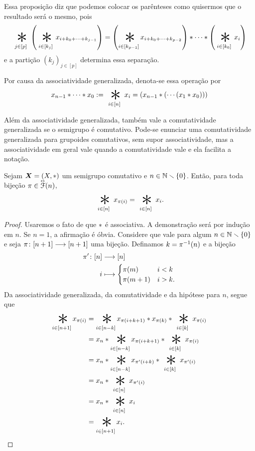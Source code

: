 Essa proposição diz que podemos colocar os parênteses como quisermos que o resultado será o mesmo, pois
	\begin{equation*}
	\bigopb_{j \in [p]}\left(\bigopb_{i \in [k_j]} x_{i + k_0 + \cdots + k_{j-1}}\right) = \left(\bigopb_{i \in [k_{p-1}]} x_{i + k_0 + \cdots + k_{p-2}}\right) \opb \cdots \opb \left(\bigopb_{i \in [k_0]} x_i\right)
	\end{equation*}
e a partição $(k_j)_{j \in [p]}$ determina essa separação.

\begin{notation}
Por causa da associatividade generalizada, denota-se essa operação por
	\begin{equation*}
	x_{n-1} \opb \cdots \opb x_0 := \bigopb_{i \in [n]} x_i = (x_{n-1} \opb ( \cdots (x_1 \opb x_0)))
	\end{equation*}
\end{notation}

Além da associatividade generalizada, também vale a comutatividade generalizada se o semigrupo é comutativo. Pode-se enunciar uma comutatividade generalizada para grupoides comutativos, sem supor associatividade, mas a associatividade em geral vale quando a comutatividade vale e ela facilita a notação.

\begin{proposition}
Sejam $\bm X=(X,\ast)$ um semigrupo comutativo e $n \in \mathbb{N} \smallsetminus \{0\}$. Então, para toda bijeção $\pi \in \accentset{\leftrightarrow}{\mathcal{F}}(n)$,%
	\begin{equation*}
	\bigopb_{i \in [n]} x_{\pi(i)} = \bigopb_{i \in [n]} x_i.
	\end{equation*}
\end{proposition}
\begin{proof}
Usaremos o fato de que $\ast$ é associativa. A demonstração será por indução em $n$. Se $n=1$, a afirmação é óbvia. Considere que vale para algum $n \in \mathbb{N} \smallsetminus \{0\}$ e seja ${\pi}\colon {[n+1]} \longrightarrow {[n+1]}$ uma bijeção. Definamos $k = \pi^{-1}(n)$ e a bijeção
	\begin{align*}
	\func{\pi'}{[n]}{[n]}{i}{
		\begin{cases}
		\pi(m)		& i<k \\
		\pi(m+1) 	& i>k.
		\end{cases}
	}
	\end{align*}
Da associatividade generalizada, da comutatividade e da hipótese para $n$, segue que
	\begin{align*}
	\bigopb_{i \in [n+1]} x_{\pi(i)}
		&= \bigopb_{i \in [n-k]} x_{\pi(i+k+1)} \opb x_{\pi(k)} \opb \bigopb_{i \in [k]} x_{\pi(i)} \\
		&= x_{n} \opb \bigopb_{i \in [n-k]} x_{\pi(i+k+1)} \opb \bigopb_{i \in [k]} x_{\pi(i)} \\
		&= x_{n} \opb \bigopb_{i \in [n-k]} x_{\pi'(i+k)} \opb \bigopb_{i \in [k]} x_{\pi'(i)} \\
		&= x_n \opb \bigopb_{i \in [n]} x_{\pi'(i)}\\
		&= x_n \opb \bigopb_{i \in [n]} x_i \\
		&= \bigopb_{i \in [n+1]} x_i.
		\qedhere
	\end{align*}
\end{proof}


